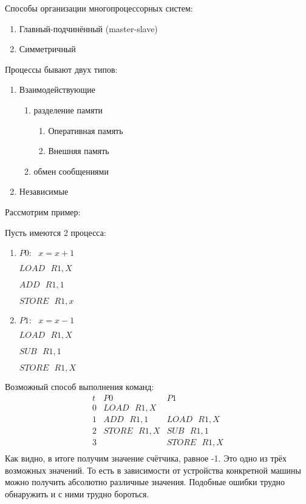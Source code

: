\documentclass[a4paper,12pt]{article}
\begin{document}
	Способы организации многопроцессорных систем:
	\begin{enumerate}
		\item Главный-подчинённый (master-slave)
		\item Симметричный
	\end{enumerate}
	Процессы бывают двух типов:
	\begin{enumerate}
		\item Взаимодействующие
			\begin{enumerate}
				\item разделение памяти
					\begin{enumerate}
						\item Оперативная память
						\item Внешняя память
					\end{enumerate}
				\item обмен сообщениями
			\end{enumerate}
		\item Независимые
	\end{enumerate}
	Рассмотрим пример:
	
	Пусть имеются 2 процесса:
	\begin{enumerate}
		\item $P0:\mbox{ } x=x+1$
				
		$LOAD\mbox{ } R1,X$
		
		$ADD\mbox{ } R1,1$
		
		$STORE\mbox{ } R1,x$
		\item $P1:\mbox{ } x=x-1$
		
		$LOAD\mbox{ } R1,X$
		
		$SUB\mbox{ } R1,1$
		
		$STORE\mbox{ } R1,X$
	\end{enumerate}
	Возможный способ выполнения команд:
	$$
	\begin{array}{ccc}
		t & P0 & P1 \\
		0 & LOAD\mbox{ } R1,X \\
		1 & ADD\mbox{ } R1,1 & LOAD\mbox{ } R1,X \\
		2 & STORE\mbox{ } R1,X & SUB\mbox{ } R1,1 \\
		3 & & STORE\mbox{ } R1,X \\
	\end{array}
	$$
	Как видно, в итоге получим значение счётчика, равное -1. Это одно из трёх возможных
значений. То есть в зависимости от устройства конкретной машины можно получить абсолютно различные
значения. Подобные ошибки трудно обнаружить и с ними трудно бороться.
\end{document}
